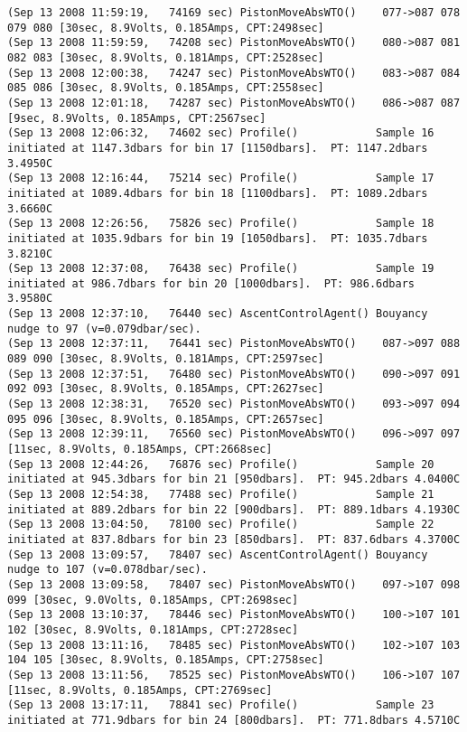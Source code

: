 {\begin{verbatim}
(Sep 13 2008 11:59:19,   74169 sec) PistonMoveAbsWTO()    077->087 078 079 080 [30sec, 8.9Volts, 0.185Amps, CPT:2498sec]
(Sep 13 2008 11:59:59,   74208 sec) PistonMoveAbsWTO()    080->087 081 082 083 [30sec, 8.9Volts, 0.181Amps, CPT:2528sec]
(Sep 13 2008 12:00:38,   74247 sec) PistonMoveAbsWTO()    083->087 084 085 086 [30sec, 8.9Volts, 0.185Amps, CPT:2558sec]
(Sep 13 2008 12:01:18,   74287 sec) PistonMoveAbsWTO()    086->087 087 [9sec, 8.9Volts, 0.185Amps, CPT:2567sec]
(Sep 13 2008 12:06:32,   74602 sec) Profile()            Sample 16 initiated at 1147.3dbars for bin 17 [1150dbars].  PT: 1147.2dbars 3.4950C
(Sep 13 2008 12:16:44,   75214 sec) Profile()            Sample 17 initiated at 1089.4dbars for bin 18 [1100dbars].  PT: 1089.2dbars 3.6660C
(Sep 13 2008 12:26:56,   75826 sec) Profile()            Sample 18 initiated at 1035.9dbars for bin 19 [1050dbars].  PT: 1035.7dbars 3.8210C
(Sep 13 2008 12:37:08,   76438 sec) Profile()            Sample 19 initiated at 986.7dbars for bin 20 [1000dbars].  PT: 986.6dbars 3.9580C
(Sep 13 2008 12:37:10,   76440 sec) AscentControlAgent() Bouyancy nudge to 97 (v=0.079dbar/sec).
(Sep 13 2008 12:37:11,   76441 sec) PistonMoveAbsWTO()    087->097 088 089 090 [30sec, 8.9Volts, 0.181Amps, CPT:2597sec]
(Sep 13 2008 12:37:51,   76480 sec) PistonMoveAbsWTO()    090->097 091 092 093 [30sec, 8.9Volts, 0.185Amps, CPT:2627sec]
(Sep 13 2008 12:38:31,   76520 sec) PistonMoveAbsWTO()    093->097 094 095 096 [30sec, 8.9Volts, 0.185Amps, CPT:2657sec]
(Sep 13 2008 12:39:11,   76560 sec) PistonMoveAbsWTO()    096->097 097 [11sec, 8.9Volts, 0.185Amps, CPT:2668sec]
(Sep 13 2008 12:44:26,   76876 sec) Profile()            Sample 20 initiated at 945.3dbars for bin 21 [950dbars].  PT: 945.2dbars 4.0400C
(Sep 13 2008 12:54:38,   77488 sec) Profile()            Sample 21 initiated at 889.2dbars for bin 22 [900dbars].  PT: 889.1dbars 4.1930C
(Sep 13 2008 13:04:50,   78100 sec) Profile()            Sample 22 initiated at 837.8dbars for bin 23 [850dbars].  PT: 837.6dbars 4.3700C
(Sep 13 2008 13:09:57,   78407 sec) AscentControlAgent() Bouyancy nudge to 107 (v=0.078dbar/sec).
(Sep 13 2008 13:09:58,   78407 sec) PistonMoveAbsWTO()    097->107 098 099 [30sec, 9.0Volts, 0.185Amps, CPT:2698sec]
(Sep 13 2008 13:10:37,   78446 sec) PistonMoveAbsWTO()    100->107 101 102 [30sec, 8.9Volts, 0.181Amps, CPT:2728sec]
(Sep 13 2008 13:11:16,   78485 sec) PistonMoveAbsWTO()    102->107 103 104 105 [30sec, 8.9Volts, 0.185Amps, CPT:2758sec]
(Sep 13 2008 13:11:56,   78525 sec) PistonMoveAbsWTO()    106->107 107 [11sec, 8.9Volts, 0.185Amps, CPT:2769sec]
(Sep 13 2008 13:17:11,   78841 sec) Profile()            Sample 23 initiated at 771.9dbars for bin 24 [800dbars].  PT: 771.8dbars 4.5710C

\end{verbatim}}
